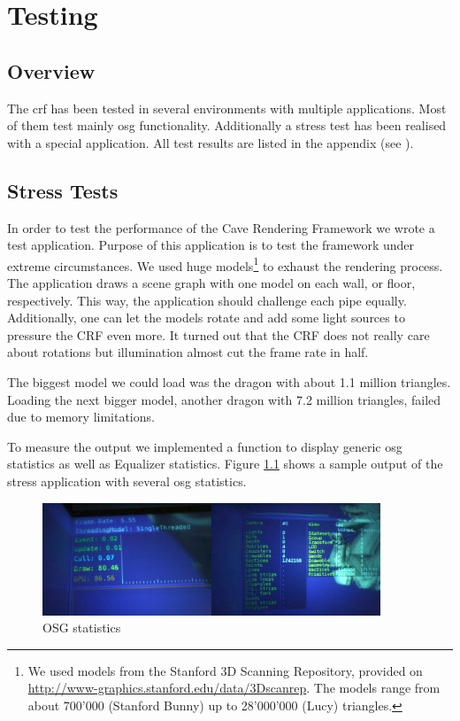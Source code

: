 \chapter{Testing}
\label{chap:Testing}

\section{Overview}
The \gls{crf} has been tested in several environments with multiple applications. Most of them test mainly \gls{osg} functionality. Additionally a stress test has been realised with a special application. All test results are listed in the appendix (see ).

\section{Stress Tests}
In order to test the performance of the Cave Rendering Framework we wrote a test application. Purpose of this application is to test the framework under extreme circumstances. We used huge models\footnote{We used models from the Stanford 3D Scanning Repository, provided on \href{http://www-graphics.stanford.edu/data/3Dscanrep}{http://www-graphics.stanford.edu/data/3Dscanrep}. The models range from about 700'000 (Stanford Bunny) up to 28'000'000 (Lucy) triangles.} to exhaust the rendering process. The application draws a scene graph with one model on each wall, or floor, respectively. This way, the application should challenge each pipe equally. Additionally, one can let the models rotate and add some light sources to pressure the CRF even more. It turned out that the CRF does not really care about rotations but illumination almost cut the frame rate in half.

The biggest model we could load was the dragon with about 1.1 million triangles. Loading the next bigger model, another dragon with 7.2 million triangles, failed due to memory limitations. 

To measure the output we implemented a function to display generic \gls{osg} statistics as well as Equalizer statistics. Figure \ref{fig:osg_stats} shows a sample output of the stress application with several \gls{osg} statistics.

\begin{figure}[H]
	\centering
	\includegraphics[width=0.9\textwidth]{../figures/fotos/osgStats}
	\caption{OSG statistics}
	\label{fig:osg_stats}
\end{figure}

